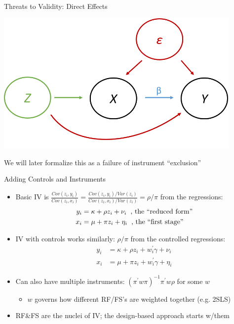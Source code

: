 \documentclass[11pt,english]{beamer}
\begin{document}
\begin{frame}{Threats to Validity: Direct Effects}
\vspace{0.2cm}

\begin{center}
	\includegraphics[width=0.9\textwidth]{figures/dag5.png}
\end{center}
We will later formalize this as a failure of instrument ``exclusion''

\end{frame}

\begin{frame}{Adding Controls and Instruments}

\begin{itemize}
\item Basic IV is $\frac{Cov(z_i,y_i)}{Cov(z_i,x_i)}=\frac{Cov(z_i,y_i)/Var(z_i)}{Cov(z_i,x_i)/Var(z_i)}=\rho/\pi$ from the regressions:
\begin{align*}
y_i &= \kappa + \rho z_i + \nu_i \hspace{0.2cm}\text{, the ``reduced form''}\\
x_i &= \mu + \pi z_i + \eta_i\hspace{0.2cm}\text{, the ``first stage'' }
\end{align*}\pause{}\vspace{-0.3cm}

\item IV with controls works similarly: $\rho/\pi$ from the controlled regressions:
\begin{align*}
y_i &= \kappa + \rho z_i + w_i^\prime\gamma + \nu_i \\
x_i &= \mu + \pi z_i + w_i^\prime \gamma + \eta_i
\end{align*}\pause{}\vspace{-0.3cm}

\item Can also have multiple instruments: $(\pi^\prime w \pi)^{-1}\pi^\prime w \rho$ for some $w$\smallskip
\begin{itemize}
\item $w$ governs how different RF/FS's are weighted together (e.g. 2SLS)
\end{itemize}\medskip\pause{}

\item RF\&FS are the nuclei of IV; the design-based approach starts w/them
\end{itemize}

\end{frame}
\end{document}
